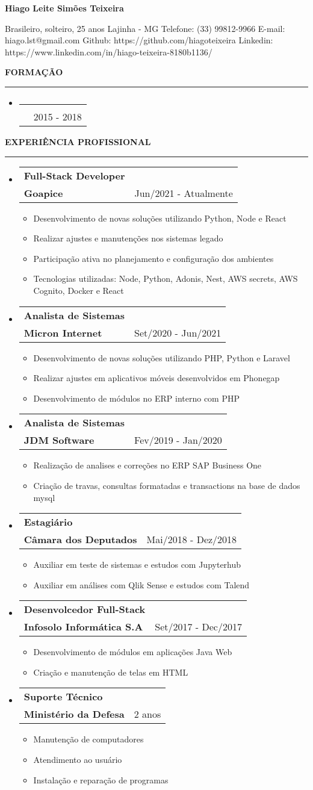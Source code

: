 \documentclass[a4paper,10pt]{article}
\makeatletter
\newcommand{\EducationItem}[3]{
    \item
    \begin{tabular*}{0.93\textwidth}[t]{l@{\extracolsep{\fill}}r}
        \normalfont{#1} & \\
        \small\normalfont{#2} & \scriptsize#3
    \end{tabular*}
}
\newcommand{\WorkExpItem}[3]{
    \item
        \begin{tabular*}{0.93\textwidth}[t]{l@{\extracolsep{\fill}}r}
            \textbf{#1} & \\
            \small\textbf{#2} & \scriptsize#3 \\
        \end{tabular*}
}
\newcommand{\WorkExpActivitiesBegin}[0]{
    \vspace{-5pt}\begin{itemize}
}
\newcommand{\WorkExpActivitiesItem}[1]{
    \vspace{-2pt}\item[]\small #1
}
\newcommand{\WorkExpActivitiesEnd}[0]{
    \end{itemize}\vspace{-7pt}
}
\newcommand{\SectionTitle}[1]{
    \begin{flushleft}
    \textbf{#1}
    \noindent\textcolor{gray}{\rule{18.5cm}{1px}}
    \end{flushleft}
}
\newcommand{\SectionBegin}[0]{
    \vspace{-16pt}\begin{flushleft}
    \begin{itemize}
}
\newcommand{\SectionEnd}[0]{
    \end{itemize}
    \end{flushleft}\vspace{-2pt}
}
\newcommand{\PersonInformation}[7]{
    \begin{flushleft}
        \begin{LARGE}
            \textbf{#1}
        \end{LARGE}
    \end{flushleft}

    \begin{flushleft}
        #2
        \newline
        #3
        \newline
        Telefone: #4
        \newline
        E-mail: #5
        \newline
        Github: #6
        \newline
        Linkedin: #7
        \newline
    \end{flushleft}
}
\makeatother
\begin{document}

\PersonInformation
{Hiago Leite Simões Teixeira}
{Brasileiro, solteiro, 25 anos}
{Lajinha - MG}
{(33) 99812-9966}
{hiago.lst@gmail.com}
{https://github.com/hiagoteixeira}
{https://www.linkedin.com/in/hiago-teixeira-8180b1136/}

\SectionTitle
{FORMA\c{C}\~{A}O}
\SectionBegin
\EducationItem
{Bacharel em Ciência da Computação}
{Centro Universitário de Brasília - UniCEUB}
{2015 - 2018}
\SectionEnd

\SectionTitle
{EXPERI\^{E}NCIA PROFISSIONAL}
\SectionBegin
\WorkExpItem
{Full-Stack Developer}
{Goapice}
{Jun/2021 - Atualmente}
\WorkExpActivitiesBegin
\WorkExpActivitiesItem{Desenvolvimento de novas solu\c{c}\~{o}es utilizando Python, Node e React}
\WorkExpActivitiesItem{Realizar ajustes e manutenções nos sistemas legado}
\WorkExpActivitiesItem{Participação ativa no planejamento e configura\c{c}\~{a}o dos ambientes}
\WorkExpActivitiesItem{Tecnologias utilizadas: Node, Python, Adonis, Nest, AWS secrets, AWS Cognito, Docker e React}
\WorkExpActivitiesEnd

\WorkExpItem
{Analista de Sistemas}
{Micron Internet}
{Set/2020 - Jun/2021}
\WorkExpActivitiesBegin
\WorkExpActivitiesItem{Desenvolvimento de novas solu\c{c}\~{o}es utilizando PHP, Python e Laravel}
\WorkExpActivitiesItem{Realizar ajustes em aplicativos móveis desenvolvidos em Phonegap}
\WorkExpActivitiesItem{Desenvolvimento de módulos no ERP interno com PHP}
\WorkExpActivitiesEnd
\WorkExpItem
{Analista de Sistemas}
{JDM Software}
{Fev/2019 - Jan/2020}
\WorkExpActivitiesBegin
\WorkExpActivitiesItem{Realiza\c{c}\~{a}o de analises e corre\c{c}\~{o}es no ERP SAP Business One}
\WorkExpActivitiesItem{Cria\c{c}\~{a}o de travas, consultas formatadas e transactions na base de dados mysql}
\WorkExpActivitiesEnd
\WorkExpItem
{Estagiário}
{C\^{a}mara dos Deputados}
{Mai/2018 - Dez/2018}
\WorkExpActivitiesBegin
\WorkExpActivitiesItem{Auxiliar em teste de sistemas e estudos com Jupyterhub}
\WorkExpActivitiesItem{Auxiliar em análises com Qlik Sense e estudos com Talend}
\WorkExpActivitiesEnd
\WorkExpItem
{Desenvolcedor Full-Stack}
{Infosolo Informática S.A}
{Set/2017 - Dec/2017}
\WorkExpActivitiesBegin
\WorkExpActivitiesItem{Desenvolvimento de módulos em aplicações Java Web}
\WorkExpActivitiesItem{Criação e manutenção de telas em HTML}
\WorkExpActivitiesEnd
\WorkExpItem
{Suporte Técnico}
{Ministério da Defesa}
{2 anos}
\WorkExpActivitiesBegin
\WorkExpActivitiesItem{Manutenção de computadores}
\WorkExpActivitiesItem{Atendimento ao usuário}
\WorkExpActivitiesItem{Instalação e reparação de programas}
\WorkExpActivitiesEnd
\SectionEnd
\end{document}
